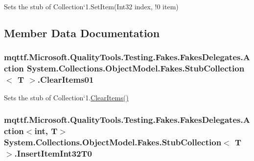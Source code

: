 Sets the stub of Collection`1.Set\-Item(Int32 index, !0 item)



\subsection{Member Data Documentation}
\hypertarget{class_system_1_1_collections_1_1_object_model_1_1_fakes_1_1_stub_collection_3_01_t_01_4_a28bba86ac8083465598c4743e8ddb343}{
\subsubsection[{Clear\-Items01}]{\setlength{\rightskip}{0pt plus 5cm}mqttf.\-Microsoft.\-Quality\-Tools.\-Testing.\-Fakes.\-Fakes\-Delegates.\-Action System.\-Collections.\-Object\-Model.\-Fakes.\-Stub\-Collection$<$ T $>$.Clear\-Items01}}\label{class_system_1_1_collections_1_1_object_model_1_1_fakes_1_1_stub_collection_3_01_t_01_4_a28bba86ac8083465598c4743e8ddb343}


Sets the stub of Collection`1.\hyperlink{class_system_1_1_collections_1_1_object_model_1_1_fakes_1_1_stub_collection_3_01_t_01_4_a87e7346e9e447dfaadf5b248f3077962}{Clear\-Items()}

\hypertarget{class_system_1_1_collections_1_1_object_model_1_1_fakes_1_1_stub_collection_3_01_t_01_4_a9023c200337e1f0dff114b9b90b5a16a}{
\subsubsection[{Insert\-Item\-Int32\-T0}]{\setlength{\rightskip}{0pt plus 5cm}mqttf.\-Microsoft.\-Quality\-Tools.\-Testing.\-Fakes.\-Fakes\-Delegates.\-Action$<$int, T$>$ System.\-Collections.\-Object\-Model.\-Fakes.\-Stub\-Collection$<$ T $>$.Insert\-Item\-Int32\-T0}}\label{class_system_1_1_collections_1_1_object_model_1_1_fakes_1_1_stub_collection_3_01_t_01_4_a9023c200337e1f0dff114b9b90b5a16a}


